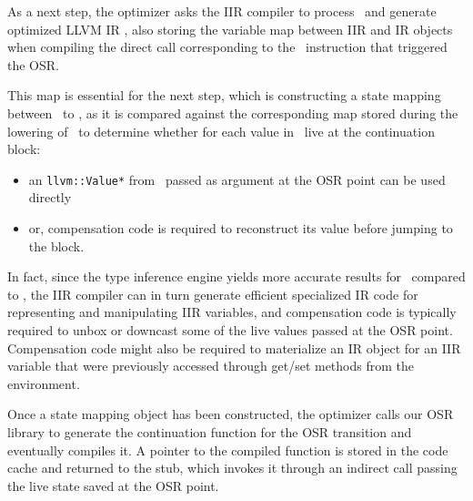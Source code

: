 As a next step, the optimizer asks the IIR compiler to process \gOptIIR\ and generate optimized LLVM IR \gOptIR, also storing the variable map between IIR and IR objects when compiling the direct call corresponding to the \feval\ instruction that triggered the OSR.
\ifdefined \fullver

\fi
This map is essential for the next step, which is constructing a state mapping between \gIR\ to \gOptIR, as it is compared against the corresponding map stored during the lowering of \gBase\ to determine whether for each value in \gOptIR\ live at the continuation block:
\begin{itemize}
\item an {\tt llvm::Value*} from \gIR\ passed as argument at the OSR point can be used directly
\item or, compensation code is required to reconstruct its value before jumping to the block.
\end{itemize}

\noindent In fact, since the type inference engine yields more accurate results for \gOptIIR\ compared to \gIIR, the IIR compiler can in turn generate efficient specialized IR code for representing and manipulating IIR variables, and compensation code is typically required to unbox or downcast some of the live values passed at the OSR point.
\ifdefined \fullver
Compensation code might also be required to materialize an IR object for an IIR variable that were previously accessed through get/set methods from the environment. %
\fi

Once a state mapping object has been constructed, the optimizer calls our OSR library to generate the continuation function for the OSR transition and eventually compiles it. A pointer to the compiled function is stored in the code cache and returned to the stub, which invokes it through an indirect call passing the live state saved at the OSR point.
